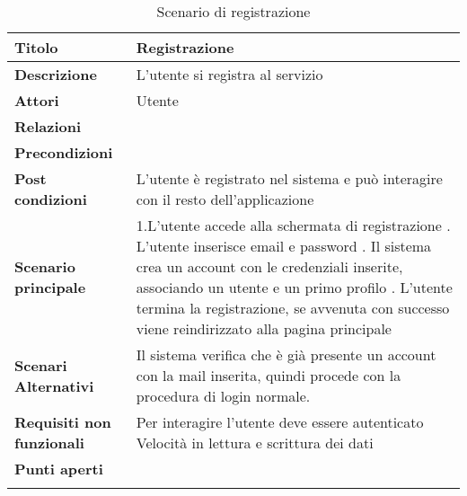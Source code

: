 \begin{longtable} {|P{4.5cm}|P{11cm}|}
    \hline
    \textbf{Titolo}                   & Registrazione                                                                         \\
    \hline
    \textbf{Descrizione}              & L'utente si registra al servizio                                                      \\
    \hline
    \textbf{Attori}                   & Utente                                                                                \\
    \hline
    \textbf{Relazioni}                &                                                                                       \\
    \hline
    \textbf{Precondizioni}            &                                                                                       \\
    \hline
    \textbf{Post condizioni}          & L'utente è registrato nel sistema e può interagire con il resto dell'applicazione     \\
    \hline
    \textbf{Scenario principale}      & 1.L'utente accede alla schermata di registrazione      . L'utente inserisce email e  password                      . Il sistema crea un account con le credenziali inserite, associando un utente e un primo profilo   . L'utente termina la registrazione, se avvenuta con successo viene reindirizzato alla pagina principale
    \\
    \hline
    \textbf{Scenari Alternativi}      &

    Il sistema verifica che è già presente un account con la mail inserita, quindi procede con la procedura di login normale. \\
    \hline
    \textbf{Requisiti non funzionali} &
    Per interagire l'utente deve essere autenticato \newline
    Velocità in lettura e scrittura dei dati                                                                                  \\
    \hline
    \textbf{Punti aperti}             &                                                                                       \\
    \hline
    \caption{Scenario di registrazione}
\end{longtable}

